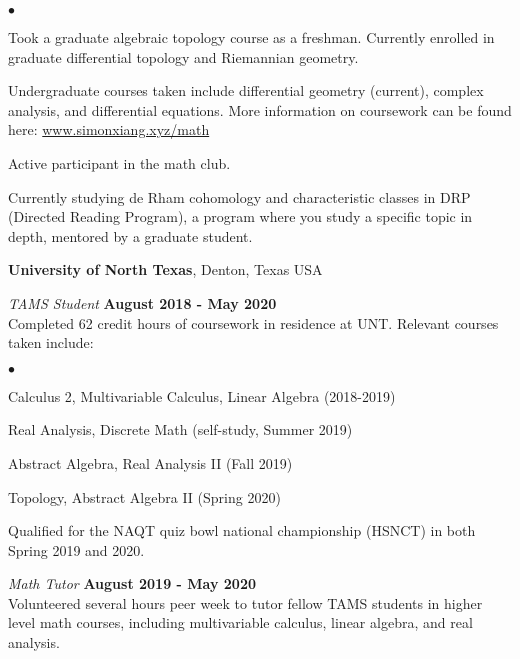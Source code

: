 \documentclass[margin,line]{res}
\newenvironment{list2}{
  \begin{list}{$\bullet$}{%
      \setlength{\itemsep}{0in}
      \setlength{\parsep}{0in} \setlength{\parskip}{0in}
      \setlength{\topsep}{0in} \setlength{\partopsep}{0in} 
      \setlength{\leftmargin}{0.2in}}}{\end{list}}
\begin{document}
\begin{resume}
\vspace{-.3cm}
\begin{list2}
\item Took a graduate algebraic topology course as a freshman. Currently enrolled in graduate differential topology and Riemannian geometry.
\item Undergraduate courses taken include differential geometry (current), complex analysis, and differential equations. More information on coursework can be found here: \url{www.simonxiang.xyz/math}
\item Active participant in the math club.
\item Currently studying de Rham cohomology and characteristic classes in DRP (Directed Reading Program), a program where you study a specific topic in depth, mentored by a graduate student.
\end{list2}


{\bf University of North Texas}, Denton, Texas USA

\vspace{-.3cm}
{\em TAMS Student} \hfill {\bf August 2018  - May 2020}\\
Completed 62 credit hours of coursework in residence at UNT. Relevant courses taken include:
\vspace{0.1cm}
\begin{list2}
\item Calculus 2, Multivariable Calculus, Linear Algebra (2018-2019)
\item Real Analysis, Discrete Math (self-study, Summer 2019)
\item Abstract Algebra, Real Analysis II (Fall 2019)
\item Topology, Abstract Algebra II (Spring 2020)
\end{list2}

\vspace{-.3cm}
Qualified for the NAQT quiz bowl national championship (HSNCT) in both Spring 2019 and 2020.

{\em Math Tutor} \hfill {\bf August 2019  - May 2020}\\
Volunteered several hours peer week to tutor fellow TAMS students in higher level math courses, including multivariable calculus, linear algebra, and real analysis.


\end{resume}
\end{document}
